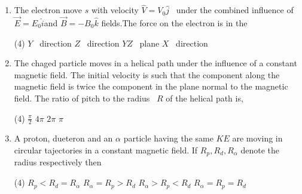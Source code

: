 \begin{enumerate}[ label=\color{ocre}\textbf{\arabic*.}]
\begin{figure}[H]
		\begin{center}
			\texttt{[image: diagram-20210428(4)-crop]}
		\end{center}
	\end{figure}
	\begin{tasks}(2)
		\task[\textbf{a.}]Downward(in the plane of the paper).
		\task[\textbf{b.}]Upward (in the plane of the paper).
		\task[\textbf{c.}]In to the paper.
		\task[\textbf{d.}]Out of the paper.
	\end{tasks}
	\item The electron move $s$ with velocity $\hat{V}=V_0 \hat{j}$ \ under the combined influence of $\vec{E}=E_0 \hat{i}$and $\vec{B}=-B_0 \hat{k}$ fields.The force on the electron is in the 
	\begin{tasks}(4)
		\task[\textbf{a.}]$Y$ \ direction
		\task[\textbf{b.}]$Z$ \ direction
		\task[\textbf{c.}]$YZ$ \ plane 
		\task[\textbf{d.}]$X$ \ direction
	\end{tasks}
	\item The chaged particle moves in a helical path under the influence of a constant magnetic field. The initial velocity is such that the component along the magnetic field is twice the component in the plane normal to the magnetic field. The ratio of pitch to the radius \ $R$ of the helical path is,
	\begin{tasks}(4)
		\task[\textbf{a.}]$\frac{\pi}{2}$
		\task[\textbf{b.}]$4\pi$
		\task[\textbf{c.}] $2\pi$
		\task[\textbf{d.}]$\pi$
	\end{tasks}
	\item A proton, dueteron and an $\alpha$ particle having the same $KE$ are moving in circular tajectories in a constant magnetic field. If $R_p,R_d,R_\alpha $ denote the radius respectively then
	\begin{tasks}(4)
		\task[\textbf{a.}]$R_p<R_d=R_\alpha$
		\task[\textbf{b.}]$R_\alpha=R_p>R_d$
		\task[\textbf{c.}]$R_\alpha>R_p<R_d$
		\task[\textbf{d.}]$R_\alpha=R_p=R_d$
	\end{tasks}
\end{enumerate}
\setlength\arrayrulewidth{1pt}
